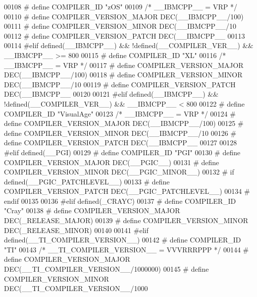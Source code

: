 \begin{DoxyCode}
{{{{{{{{{{{{{{00108 \textcolor{preprocessor}{# define COMPILER\_ID "zOS"}
00109   \textcolor{comment}{/* \_\_IBMCPP\_\_ = VRP */}
00110 \textcolor{preprocessor}{# define COMPILER\_VERSION\_MAJOR DEC(\_\_IBMCPP\_\_/100)}
00111 \textcolor{preprocessor}{# define COMPILER\_VERSION\_MINOR DEC(\_\_IBMCPP\_\_/10 %
00112 \textcolor{preprocessor}{# define COMPILER\_VERSION\_PATCH DEC(\_\_IBMCPP\_\_    %
00113 
00114 \textcolor{preprocessor}{#elif defined(\_\_IBMCPP\_\_) && !defined(\_\_COMPILER\_VER\_\_) && \_\_IBMCPP\_\_ >= 800}
00115 \textcolor{preprocessor}{# define COMPILER\_ID "XL"}
00116   \textcolor{comment}{/* \_\_IBMCPP\_\_ = VRP */}
00117 \textcolor{preprocessor}{# define COMPILER\_VERSION\_MAJOR DEC(\_\_IBMCPP\_\_/100)}
00118 \textcolor{preprocessor}{# define COMPILER\_VERSION\_MINOR DEC(\_\_IBMCPP\_\_/10 %
00119 \textcolor{preprocessor}{# define COMPILER\_VERSION\_PATCH DEC(\_\_IBMCPP\_\_    %
00120 
00121 \textcolor{preprocessor}{#elif defined(\_\_IBMCPP\_\_) && !defined(\_\_COMPILER\_VER\_\_) && \_\_IBMCPP\_\_ < 800}
00122 \textcolor{preprocessor}{# define COMPILER\_ID "VisualAge"}
00123   \textcolor{comment}{/* \_\_IBMCPP\_\_ = VRP */}
00124 \textcolor{preprocessor}{# define COMPILER\_VERSION\_MAJOR DEC(\_\_IBMCPP\_\_/100)}
00125 \textcolor{preprocessor}{# define COMPILER\_VERSION\_MINOR DEC(\_\_IBMCPP\_\_/10 %
00126 \textcolor{preprocessor}{# define COMPILER\_VERSION\_PATCH DEC(\_\_IBMCPP\_\_    %
00127 
00128 \textcolor{preprocessor}{#elif defined(\_\_PGI)}
00129 \textcolor{preprocessor}{# define COMPILER\_ID "PGI"}
00130 \textcolor{preprocessor}{# define COMPILER\_VERSION\_MAJOR DEC(\_\_PGIC\_\_)}
00131 \textcolor{preprocessor}{# define COMPILER\_VERSION\_MINOR DEC(\_\_PGIC\_MINOR\_\_)}
00132 \textcolor{preprocessor}{# if defined(\_\_PGIC\_PATCHLEVEL\_\_)}
00133 \textcolor{preprocessor}{#  define COMPILER\_VERSION\_PATCH DEC(\_\_PGIC\_PATCHLEVEL\_\_)}
00134 \textcolor{preprocessor}{# endif}
00135 
00136 \textcolor{preprocessor}{#elif defined(\_CRAYC)}
00137 \textcolor{preprocessor}{# define COMPILER\_ID "Cray"}
00138 \textcolor{preprocessor}{# define COMPILER\_VERSION\_MAJOR DEC(\_RELEASE\_MAJOR)}
00139 \textcolor{preprocessor}{# define COMPILER\_VERSION\_MINOR DEC(\_RELEASE\_MINOR)}
00140 
00141 \textcolor{preprocessor}{#elif defined(\_\_TI\_COMPILER\_VERSION\_\_)}
00142 \textcolor{preprocessor}{# define COMPILER\_ID "TI"}
00143   \textcolor{comment}{/* \_\_TI\_COMPILER\_VERSION\_\_ = VVVRRRPPP */}
00144 \textcolor{preprocessor}{# define COMPILER\_VERSION\_MAJOR DEC(\_\_TI\_COMPILER\_VERSION\_\_/1000000)}
00145 \textcolor{preprocessor}{# define COMPILER\_VERSION\_MINOR DEC(\_\_TI\_COMPILER\_VERSION\_\_/1000   %
}}}}}}}}}}}}}}}}}}}}}
\end{DoxyCode}
